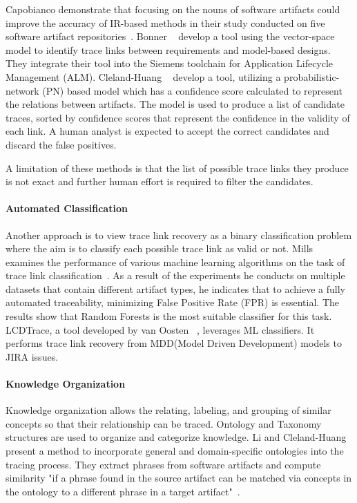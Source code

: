 Capobianco \etal{} demonstrate that focusing on the nouns of software artifacts could improve the accuracy of IR-based methods in their study conducted on five software artifact repositories~\cite{capobianco-2013}.
Bonner \etal{}~\cite{bonner-2023} develop a tool using the vector-space model to identify trace links between requirements and model-based designs. They  integrate their tool into the Siemens toolchain for Application Lifecycle Management (ALM).
Cleland-Huang \etal{}~\cite{cleland-huang-2007} develop a tool, utilizing a probabilistic-network (PN) based model which has a confidence score calculated to represent the relations between artifacts. The model is used to produce a list of candidate traces, sorted by confidence scores that represent the confidence in the validity of each link. A human analyst is expected to accept the correct candidates and discard the false positives. %

A limitation of these methods is that the list of possible trace links they produce is not exact and further human effort is required to filter the candidates.

\paragraph{Automated Classification} Another approach is to view trace link recovery as a binary classification problem where the aim is to classify each possible trace link as valid or not. Mills examines the performance of various machine learning algorithms on the task of trace link classification~\cite{mills-2017}. As a result of the experiments he conducts on multiple datasets that contain different artifact types, he indicates that to achieve a fully automated traceability, minimizing False Positive Rate (FPR) is essential. The results show that Random Forests is the most suitable classifier for this task.
LCDTrace, a tool developed by van Oosten \etal{}~\cite{VANOOSTEN2023107226}, leverages ML classifiers. It performs trace link recovery from MDD(Model Driven Development) models to JIRA issues.

\paragraph{Knowledge Organization} Knowledge organization allows the relating, labeling, and grouping of similar concepts so that their relationship can be traced. Ontology and Taxonomy structures are used to organize and categorize knowledge.
Li and Cleland-Huang present a method to incorporate general and domain-specific ontologies into the tracing process. They extract phrases from software artifacts and compute similarity "if a phrase found in the source artifact can be matched via concepts in the ontology to a different phrase in a target
artifact"~\cite{Ontology}.

